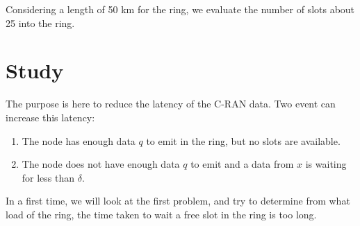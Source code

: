 \documentclass[a4paper,10pt]{article}
\begin{document}
Considering a length of 50 km for the ring, we evaluate the number of slots about 25 into the ring.

\section*{Study}
The purpose is here to reduce the latency of the C-RAN data. Two event can increase this latency: 
\begin{enumerate}
  \item The node has enough data $q$ to emit in the ring, but no slots are available.
 \item The node does not have enough data $q$ to emit and a data from $x$ is waiting for less than $\delta$.
\end{enumerate}

In a first time, we will look at the first problem, and try to determine from what load of the ring, the time taken to wait a free slot in the ring is too long.
\end{document}
